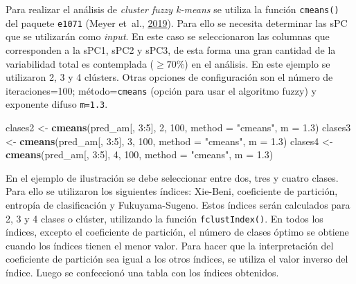 \documentclass[11pt,b5paper,]{krantz}
\newenvironment{Shaded}{}{}
\newcommand{\KeywordTok}[1]{\textcolor[rgb]{0.00,0.44,0.13}{\textbf{#1}}}
\newcommand{\DataTypeTok}[1]{\textcolor[rgb]{0.56,0.13,0.00}{#1}}
\newcommand{\DecValTok}[1]{\textcolor[rgb]{0.25,0.63,0.44}{#1}}
\newcommand{\FloatTok}[1]{\textcolor[rgb]{0.25,0.63,0.44}{#1}}
\newcommand{\StringTok}[1]{\textcolor[rgb]{0.25,0.44,0.63}{#1}}
\newcommand{\OperatorTok}[1]{\textcolor[rgb]{0.40,0.40,0.40}{#1}}
\newcommand{\NormalTok}[1]{#1}
\begin{document}
Para realizar el análisis de \emph{cluster fuzzy k-means} se utiliza la
función \texttt{cmeans()} del paquete \texttt{e1071} (Meyer et~al.,
\protect\hyperlink{ref-R-e1071}{2019}). Para ello se necesita determinar
las sPC que se utilizarán como \emph{input}. En este caso se
seleccionaron las columnas que corresponden a la sPC1, sPC2 y sPC3, de
esta forma una gran cantidad de la variabilidad total es contemplada
(\(\ge 70 \%\)) en el análisis. En este ejemplo se utilizaron 2, 3 y 4
clústers. Otras opciones de configuración son el número de
iteraciones=100; método=\texttt{cmeans} (opción para usar el algoritmo
fuzzy) y exponente difuso \texttt{m=1.3}.

\begin{Shaded}
\begin{Highlighting}[]
\NormalTok{clases2 <-}\StringTok{ }\KeywordTok{cmeans}\NormalTok{(pred_am[, }\DecValTok{3}\OperatorTok{:}\DecValTok{5}\NormalTok{], }\DecValTok{2}\NormalTok{, }
                  \DecValTok{100}\NormalTok{, }\DataTypeTok{method =} \StringTok{"cmeans"}\NormalTok{, }
                  \DataTypeTok{m =} \FloatTok{1.3}\NormalTok{)}
\NormalTok{clases3 <-}\StringTok{ }\KeywordTok{cmeans}\NormalTok{(pred_am[, }\DecValTok{3}\OperatorTok{:}\DecValTok{5}\NormalTok{], }\DecValTok{3}\NormalTok{, }
                  \DecValTok{100}\NormalTok{, }\DataTypeTok{method =} \StringTok{"cmeans"}\NormalTok{, }
                  \DataTypeTok{m =} \FloatTok{1.3}\NormalTok{)}
\NormalTok{clases4 <-}\StringTok{ }\KeywordTok{cmeans}\NormalTok{(pred_am[, }\DecValTok{3}\OperatorTok{:}\DecValTok{5}\NormalTok{], }\DecValTok{4}\NormalTok{, }
                  \DecValTok{100}\NormalTok{, }\DataTypeTok{method =} \StringTok{"cmeans"}\NormalTok{, }
                  \DataTypeTok{m =} \FloatTok{1.3}\NormalTok{)}
\end{Highlighting}
\end{Shaded}

En el ejemplo de ilustración se debe seleccionar entre dos, tres y
cuatro clases. Para ello se utilizaron los siguientes índices: Xie-Beni,
coeficiente de partición, entropía de clasificación y Fukuyama-Sugeno.
Estos índices serán calculados para 2, 3 y 4 clases o clúster,
utilizando la función \texttt{fclustIndex()}. En todos los índices,
excepto el coeficiente de partición, el número de clases óptimo se
obtiene cuando los índices tienen el menor valor. Para hacer que la
interpretación del coeficiente de partición sea igual a los otros
índices, se utiliza el valor inverso del índice. Luego se confeccionó
una tabla con los índices obtenidos.
\end{document}
